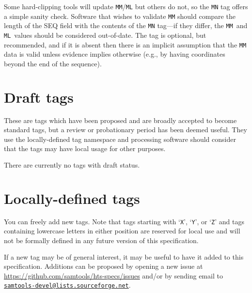 \documentclass[10pt]{article}
\newcommand{\mailtourl}[1]{\href{mailto:#1}{\tt #1}}
\begin{document}
\begin{description}
Some hard-clipping tools will update {\tt MM}/{\tt ML} but others do not, so the {\tt MN} tag offers a simple sanity check.
Software that wishes to validate {\tt MM} should compare the length of the {\sf SEQ} field with the contents of the {\tt MN} tag---if they differ, the {\tt MM}~and {\tt ML}~values should be considered out-of-date.
The tag is optional, but recommended, and if it is absent then there is an implicit assumption that the {\tt MM} data is valid unless evidence implies otherwise (e.g., by having coordinates beyond the end of the sequence).

\end{description}

\section{Draft tags}

These are tags which have been proposed and are broadly accepted to
become standard tags, but a review or probationary period has been
deemed useful.  They use the locally-defined tag namespace and
processing software should consider that the tags may have local usage
for other purposes.

\vspace*{1em}
There are currently no tags with draft status.



\section{Locally-defined tags}

You can freely add new tags.
Note that tags starting with `{\tt X}', `{\tt Y}', or `{\tt Z}' and tags
containing lowercase letters in either position are reserved for local use
and will not be formally defined in any future version of this specification.

If a new tag may be of general interest, it may be useful to have it added
to this specification.  Additions can be proposed by opening a new issue at
\url{https://github.com/samtools/hts-specs/issues} and/or by sending email
to \mailtourl{samtools-devel@lists.sourceforge.net}.
\end{document}
